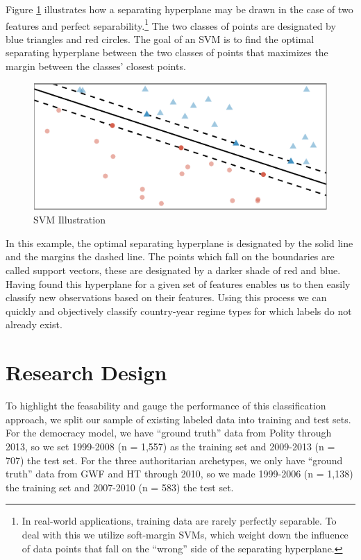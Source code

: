 \documentclass[pdftex,12pt,fullpage,oneside]{amsart}
\begin{document}
Figure \ref{fig:svmIntro} illustrates how a separating hyperplane may be drawn in the case of two features and perfect separability.\footnote{In real-world applications, training data are rarely perfectly separable. To deal with this we utilize soft-margin SVMs, which weight down the influence of data points that fall on the ``wrong'' side of the separating hyperplane.} The two classes of points are designated by blue triangles and red circles. The goal of an SVM is to find the optimal separating hyperplane between the two classes of points that maximizes the margin between the classes' closest points. 

\begin{figure}[ht]
	\centering
	\includegraphics[width=.7\textwidth]{svmIntro}
	\caption{SVM Illustration}
	\label{fig:svmIntro}
\end{figure}
\FloatBarrier

In this example, the optimal separating hyperplane is designated by the solid line and the margins the dashed line. The points which fall on the boundaries are called support vectors, these are designated by a darker shade of red and blue. Having found this hyperplane for a given set of features enables us to then easily classify new observations based on their features. Using this process we can quickly and objectively classify country-year regime types for which labels do not already exist.

\section{Research Design}

To highlight the feasability and gauge the performance of this classification approach, we split our sample of existing labeled data into training and test sets. For the democracy model, we have ``ground truth'' data from Polity through 2013, so we set 1999-2008 (n = 1,557) as the training set and 2009-2013 (n = 707) the test set. For the three authoritarian archetypes, we only have ``ground truth'' data from GWF and HT through 2010, so we made 1999-2006 (n = 1,138) the training set and 2007-2010 (n = 583) the test set. 
\end{document}
